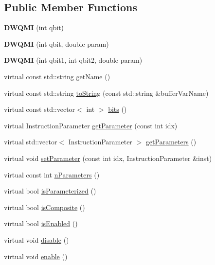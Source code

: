 \subsection*{Public Member Functions}
\begin{DoxyCompactItemize}
\item 
\mbox{\label{a00987_a7fa74443cf18934c1f166e8343eada48}} 
{\bfseries D\+W\+Q\+MI} (int qbit)
\item 
\mbox{\label{a00987_a219507677fcdf59ee0ddfa8c78e59539}} 
{\bfseries D\+W\+Q\+MI} (int qbit, double param)
\item 
\mbox{\label{a00987_aabe1dbbc737114b2f96434592e1f115a}} 
{\bfseries D\+W\+Q\+MI} (int qbit1, int qbit2, double param)
\item 
virtual const std\+::string \hyperlink{a00987_ad93428eb61adade7bb99c7633bb02aca}{get\+Name} ()
\item 
virtual const std\+::string \hyperlink{a00987_a8d8742bb6743cf6e49f95966d05bbec2}{to\+String} (const std\+::string \&buffer\+Var\+Name)
\item 
virtual const std\+::vector$<$ int $>$ \hyperlink{a00987_a76939c29e4763d10c57ea9a270229421}{bits} ()
\item 
virtual Instruction\+Parameter \hyperlink{a00987_aa15882df55d3f0af3a2ec9d72a2db4c0}{get\+Parameter} (const int idx)
\item 
virtual std\+::vector$<$ Instruction\+Parameter $>$ \hyperlink{a00987_a896d9a4e2876129c2cf81ef028daf1ff}{get\+Parameters} ()
\item 
virtual void \hyperlink{a00987_a194b5b9f58262774fde0285f4c3f60af}{set\+Parameter} (const int idx, Instruction\+Parameter \&inst)
\item 
virtual const int \hyperlink{a00987_afdfc8b852ba29c2b21c5c368098ffc4c}{n\+Parameters} ()
\item 
virtual bool \hyperlink{a00987_aee43b2e499f122dfe250b529a3f77add}{is\+Parameterized} ()
\item 
virtual bool \hyperlink{a00987_ad2b3b4ee72dee48150bf78d92c52e5e0}{is\+Composite} ()
\item 
virtual bool \hyperlink{a00987_aea76901b30d85172ef26fc317b4c0ed7}{is\+Enabled} ()
\item 
virtual void \hyperlink{a00987_af6d9120d8f60984767a330d5cfe9140f}{disable} ()
\item 
virtual void \hyperlink{a00987_ae4f563cead75aaa43f06db83e90ee855}{enable} ()
\end{DoxyCompactItemize}
